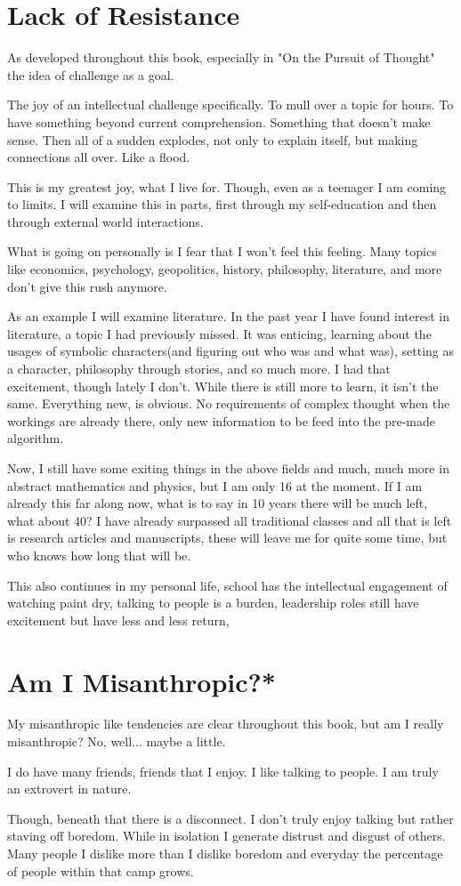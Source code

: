 \section{Lack of Resistance}
\par As developed throughout this book, especially in "On the Pursuit of Thought" the idea of challenge as a goal. 
\par The joy of an intellectual challenge specifically. To mull over a topic for hours. To have something beyond current comprehension. Something that doesn't make sense. Then all of a sudden explodes, not only to explain itself, but making connections all over. Like a flood. 
\par This is my greatest joy, what I live for. Though, even as a teenager I am coming to limits. I will examine this in parts, first through my self-education and then through external world interactions.
\par What is going on personally is I fear that I won't feel this feeling. Many topics like economics, psychology, geopolitics, history, philosophy, literature, and more don't give this rush anymore.
\par As an example I will examine literature. In the past year I have found interest in literature, a topic I had previously missed. It was enticing, learning about the usages of symbolic characters(and figuring out who was and what was), setting as a character, philosophy through stories, and so much more. I had that excitement, though lately I don't. While there is still more to learn, it isn't the same. Everything new, is obvious. No requirements of complex thought when the workings are already there, only new information to be feed into the pre-made algorithm.
\par Now, I still have some exiting things in the above fields and much, much more in abstract mathematics and physics, but I am only 16 at the moment. If I am already this far along now, what is to say in 10 years there will be much left, what about 40? I have already surpassed all traditional classes and all that is left is research articles and manuscripts, these will leave me for quite some time, but who knows how long that will be.
\par This also continues in my personal life, school has the intellectual engagement of watching paint dry, talking to people is a burden, leadership roles still have excitement but have less and less return,
\section{Am I Misanthropic?*}
\par My misanthropic like tendencies are clear throughout this book, but am I really misanthropic? No, well... maybe a little.
\par I do have many friends, friends that I enjoy. I like talking to people. I am truly an extrovert in nature. 
\par Though, beneath that there is a disconnect. I don't truly enjoy talking but rather staving off boredom. While in isolation I generate distrust and disgust of others. Many people I dislike more than I dislike boredom and everyday the percentage of people within that camp grows. 
\par 
